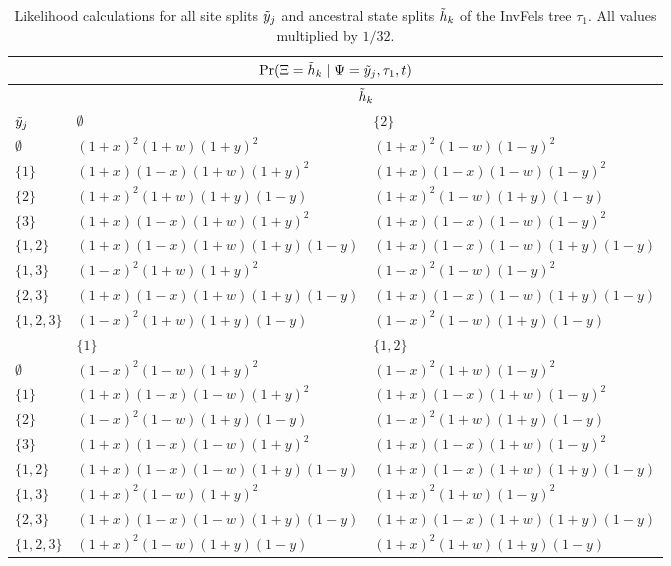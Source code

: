 \begin{table}
\centering
\begin{tabular}{|l|ll|}
\multicolumn{3}{c}{$\Pr(\Xi=\tilde{h}_k \mid \Psi=\tilde{y}_j, \tau_1, t)$}\\
\hline
& \multicolumn{2}{|c|}{$\tilde{h}_k$}\\
    \hline
    $\tilde{y}_j$    &$\emptyset$                                &$\{2\}$  \\
    \hline
     $\emptyset$   &$(1+x)^2   (1+w)(1+y)^2$          &$(1+x)^2   (1-w)(1-y)^2$\\
     $\{1\}$       &$(1+x)(1-x)(1+w)(1+y)^2$          &$(1+x)(1-x)(1-w)(1-y)^2$\\
     $\{2\}$       &$(1+x)^2   (1+w)(1+y)(1-y)$       &$(1+x)^2   (1-w)(1+y)(1-y)$\\
     $\{3\}$       &$(1+x)(1-x)(1+w)(1+y)^2$          &$(1+x)(1-x)(1-w)(1-y)^2$\\
     $\{1,2\}$     &$(1+x)(1-x)(1+w)(1+y)(1-y)$       &$(1+x)(1-x)(1-w)(1+y)(1-y)$\\
     $\{1,3\}$     &$(1-x)^2   (1+w)(1+y)^2$          &$(1-x)^2   (1-w)(1-y)^2$\\
     $\{2,3\}$     &$(1+x)(1-x)(1+w)(1+y)(1-y)$       &$(1+x)(1-x)(1-w)(1+y)(1-y)$\\
     $\{1,2,3\}$   &$(1-x)^2   (1+w)(1+y)(1-y)$       &$(1-x)^2   (1-w)(1+y)(1-y)$\\
    \hline
    \hline
    &$\{1\}$                             &$\{1,2\}$  \\
    \hline
     $\emptyset$   &$(1-x)^2   (1-w)(1+y)^2$     &$(1-x)^2   (1+w)(1-y)^2$\\
     $\{1\}$       &$(1+x)(1-x)(1-w)(1+y)^2$     &$(1+x)(1-x)(1+w)(1-y)^2$\\
     $\{2\}$       &$(1-x)^2   (1-w)(1+y)(1-y)$  &$(1-x)^2   (1+w)(1+y)(1-y)$\\
     $\{3\}$       &$(1+x)(1-x)(1-w)(1+y)^2$     &$(1+x)(1-x)(1+w)(1-y)^2$\\
     $\{1,2\}$     &$(1+x)(1-x)(1-w)(1+y)(1-y)$  &$(1+x)(1-x)(1+w)(1+y)(1-y)$\\
     $\{1,3\}$     &$(1+x)^2   (1-w)(1+y)^2$     &$(1+x)^2   (1+w)(1-y)^2$\\
     $\{2,3\}$     &$(1+x)(1-x)(1-w)(1+y)(1-y)$  &$(1+x)(1-x)(1+w)(1+y)(1-y)$\\
     $\{1,2,3\}$   &$(1+x)^2   (1-w)(1+y)(1-y)$  &$(1+x)^2   (1+w)(1+y)(1-y)$\\
    \hline
\end{tabular}
\caption{Likelihood calculations for all site splits $\tilde{y}_j$ and ancestral state splits $\tilde{h}_k$ of the InvFels tree $\tau_1$.
All values multiplied by $1/32$.}
\label{tab:farris_likelihoods}
\end{table}

